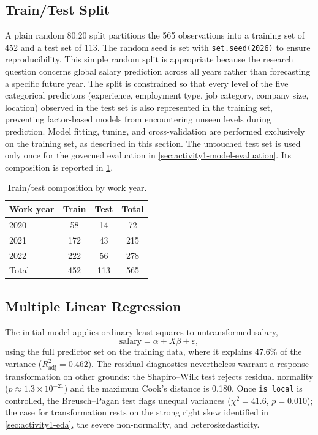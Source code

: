 \subsection{Train/Test Split}
\label{subsec:train-test-split}

A plain random 80:20 split partitions the 565 observations into a training set of
452 and a test set of 113. The random seed is set with
\texttt{set.seed(2026)} to ensure reproducibility. This simple random split is
appropriate because the research question concerns global salary prediction across
all years rather than forecasting a specific future year. The split is constrained
so that every level of the five categorical predictors (experience, employment
type, job category, company size, location) observed in the test set is also
represented in the training set, preventing factor-based models from encountering
unseen levels during prediction. Model fitting, tuning, and cross-validation are
performed exclusively on the training set, as described in this section. The
untouched test set is used only once for the governed evaluation in
\cref{sec:activity1-model-evaluation}. Its composition is reported in
\cref{tab:train-test-split}.

\begin{table}[htbp]
    \centering
    \caption{Train/test composition by work year.}
    \label{tab:train-test-split}
    \small
    \begin{tabular}{lccc}
        \toprule
        \textbf{Work year} & \textbf{Train} & \textbf{Test} & \textbf{Total} \\
        \midrule
        2020  & 58  & 14  & 72  \\
        2021  & 172 & 43  & 215 \\
        2022  & 222 & 56  & 278 \\
        \midrule
        Total & 452 & 113 & 565 \\
        \bottomrule
    \end{tabular}
\end{table}

\subsection{Multiple Linear Regression}
\label{subsec:multiple-linear-regression}

The initial model applies ordinary least squares to untransformed salary,
\[
    \mathrm{salary} = \alpha + X\beta + \varepsilon,
\]
using the full predictor set on the training data, where it explains 47.6\% of the
variance ($R^2_{\mathrm{adj}} = 0.462$). The residual diagnostics nevertheless
warrant a response transformation on other grounds: the Shapiro--Wilk test rejects
residual normality ($p \approx 1.3 \times 10^{-21}$) and the maximum Cook's distance
is 0.180. Once \texttt{is\_local} is controlled, the Breusch--Pagan test flags
unequal variances ($\chi^2 = 41.6$, $p = 0.010$); the case for transformation
rests on the strong right skew identified in \cref{sec:activity1-eda}, the
severe non-normality, and heteroskedasticity.

